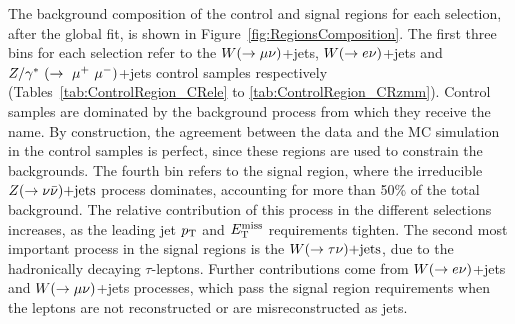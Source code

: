 The background composition of the control and signal regions for each selection, after the global fit, is shown in Figure~\ref{fig:RegionsComposition}.
The first three bins for each selection refer to the $W(\rightarrow \mu \nu)$+jets, $W(\rightarrow e \nu)$+jets and $Z/\gamma^*~(\rightarrow~\mu^+~\mu^-)$+jets control samples respectively (Tables~\ref{tab:ControlRegion_CRele} to \ref{tab:ControlRegion_CRzmm}).
Control samples are dominated by the background process from which they receive the name.
By construction, the agreement between the data and the MC simulation in the control samples is perfect, since these regions are used to constrain the backgrounds. 
The fourth bin refers to the signal region, where the irreducible $Z(\rightarrow \nu \bar{\nu})\text{+jets}$ process dominates, accounting for more than 50\% of the total background.
The relative contribution of this process in the different selections increases, as the leading jet $p_{\mathrm{T}}$ and $E_{\mathrm{T}}^{\mathrm{miss}}$ requirements tighten.
The second most important process in the signal regions is the $W(\rightarrow \tau \nu)\text{+jets}$, due to the hadronically decaying $\tau$-leptons.
Further contributions come from $W(\rightarrow e \nu)$+jets and $W(\rightarrow \mu \nu)$+jets processes, which pass the signal region requirements when the leptons are not reconstructed or are misreconstructed as jets.


